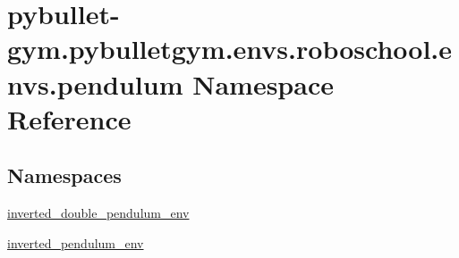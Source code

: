 \hypertarget{namespacepybullet-gym_1_1pybulletgym_1_1envs_1_1roboschool_1_1envs_1_1pendulum}{}\section{pybullet-\/gym.pybulletgym.\+envs.\+roboschool.\+envs.\+pendulum Namespace Reference}
\label{namespacepybullet-gym_1_1pybulletgym_1_1envs_1_1roboschool_1_1envs_1_1pendulum}
\subsection*{Namespaces}
\begin{DoxyCompactItemize}
\item 
 \hyperlink{namespacepybullet-gym_1_1pybulletgym_1_1envs_1_1roboschool_1_1envs_1_1pendulum_1_1inverted__double__pendulum__env}{inverted\+\_\+double\+\_\+pendulum\+\_\+env}
\item 
 \hyperlink{namespacepybullet-gym_1_1pybulletgym_1_1envs_1_1roboschool_1_1envs_1_1pendulum_1_1inverted__pendulum__env}{inverted\+\_\+pendulum\+\_\+env}
\end{DoxyCompactItemize}
